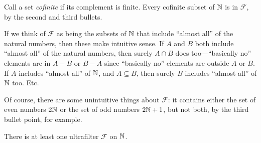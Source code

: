 Call a set \textit{cofinite} if its complement is finite. Every cofinite subset of $\mathbb{N}$ is in $\mathcal{F}$, by the second and third bullets. 

If we think of $\mathcal{F}$ as being the subsets of $\mathbb{N}$ that include ``almost all'' of the natural numbers, then these make intuitive sense. If $A$ and $B$ both include ``almost all'' of the natural numbers, then surely $A \cap B$ does too---``basically no'' elements are in $A - B$ or $B - A$ since ``basically no'' elements are outside $A$ or $B$. If $A$ includes ``almost all'' of $\mathbb{N}$, and $A \subseteq B$, then surely $B$ includes ``almost all'' of $\mathbb{N}$ too. Etc.

Of course, there are some unintuitive things about $\mathcal{F}$: it contains either the set of even numbers $2\mathbb{N}$ or the set of odd numbers $2\mathbb{N} + 1$, but not both, by the third bullet point, for example. 

\begin{thm}
    There is at least one ultrafilter $\mathcal{F}$ on $\mathbb{N}$.
\end{thm}

